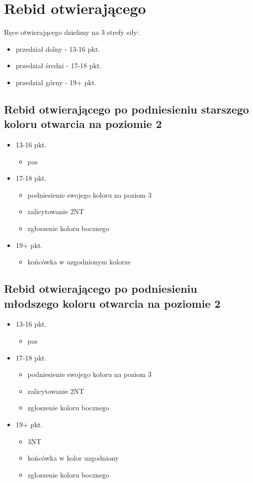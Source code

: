 \documentclass{article}
\begin{document}
    \section{Rebid otwierającego}
    Ręce otwierającego dzielimy na 3 strefy siły:
    	\begin{itemize}
    	\item przedział dolny - 13-16 pkt.
    	\item przedział średni - 17-18 pkt.
    	\item przedział górny - 19+ pkt.
    	\end{itemize}
    	\subsection{Rebid otwierającego po podniesieniu starszego koloru otwarcia na poziomie 2}
    	\begin{itemize}
    		\item 13-16 pkt.
    			\begin{itemize}
    				\item pas
    			\end{itemize}
    		\item 17-18 pkt.
    			\begin{itemize}
    				\item podniesienie swojego koloru na poziom 3
    				\item zalicytowanie 2NT
    				\item zgłoszenie koloru bocznego
    			\end{itemize}
    		\item 19+ pkt.
    			\begin{itemize}
    				\item końcówka w uzgodnionym kolorze
    			\end{itemize}
    	\end{itemize}
    	\subsection{Rebid otwierającego po podniesieniu młodszego koloru otwarcia na poziomie 2}
    	\begin{itemize}
    		\item 13-16 pkt.
    			\begin{itemize}
    				\item pas
    			\end{itemize}
    		\item 17-18 pkt.
    			\begin{itemize}
    				\item podniesienie swojego koloru na poziom 3
    				\item zalicytowanie 2NT
    				\item zgłoszenie koloru bocznego
    			\end{itemize}
    		\item 19+ pkt.
    			\begin{itemize}
    				\item 3NT
    				\item końcówka w kolor uzgodniony
    				\item zgłoszenie koloru bocznego
    			\end{itemize}
    	\end{itemize}
\end{document}
